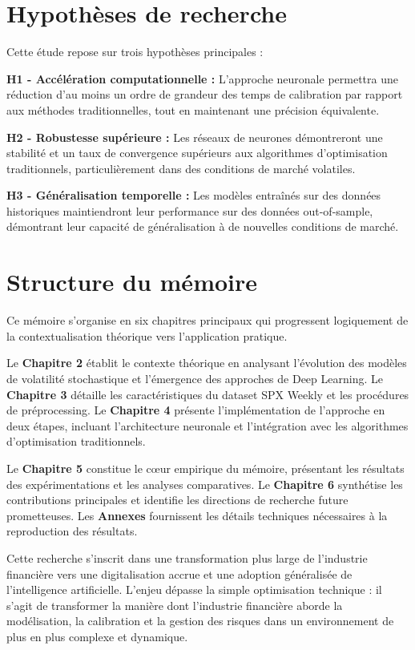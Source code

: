 \section{Hypothèses de recherche}

Cette étude repose sur trois hypothèses principales :

\textbf{H1 - Accélération computationnelle :} L'approche neuronale permettra une réduction d'au moins un ordre de grandeur des temps de calibration par rapport aux méthodes traditionnelles, tout en maintenant une précision équivalente.

\textbf{H2 - Robustesse supérieure :} Les réseaux de neurones démontreront une stabilité et un taux de convergence supérieurs aux algorithmes d'optimisation traditionnels, particulièrement dans des conditions de marché volatiles.

\textbf{H3 - Généralisation temporelle :} Les modèles entraînés sur des données historiques maintiendront leur performance sur des données out-of-sample, démontrant leur capacité de généralisation à de nouvelles conditions de marché.

\section{Structure du mémoire}

Ce mémoire s'organise en six chapitres principaux qui progressent logiquement de la contextualisation théorique vers l'application pratique.

Le \textbf{Chapitre 2} établit le contexte théorique en analysant l'évolution des modèles de volatilité stochastique et l'émergence des approches de Deep Learning. Le \textbf{Chapitre 3} détaille les caractéristiques du dataset SPX Weekly et les procédures de préprocessing. Le \textbf{Chapitre 4} présente l'implémentation de l'approche en deux étapes, incluant l'architecture neuronale et l'intégration avec les algorithmes d'optimisation traditionnels.

Le \textbf{Chapitre 5} constitue le cœur empirique du mémoire, présentant les résultats des expérimentations et les analyses comparatives. Le \textbf{Chapitre 6} synthétise les contributions principales et identifie les directions de recherche future prometteuses. Les \textbf{Annexes} fournissent les détails techniques nécessaires à la reproduction des résultats.

Cette recherche s'inscrit dans une transformation plus large de l'industrie financière vers une digitalisation accrue et une adoption généralisée de l'intelligence artificielle. L'enjeu dépasse la simple optimisation technique : il s'agit de transformer la manière dont l'industrie financière aborde la modélisation, la calibration et la gestion des risques dans un environnement de plus en plus complexe et dynamique.
